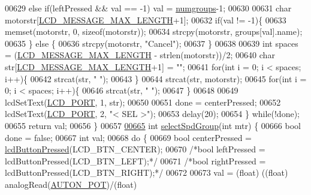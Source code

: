 \begin{DoxyCode}
{{{{{{{{{{00629         \textcolor{keywordflow}{else} \textcolor{keywordflow}{if}(leftPressed && val == -1) val = \hyperlink{lcddiag_8c_a205f1cedec1664555276e0a71a1c87d8}{numgroups}-1;
00630 
00631         \textcolor{keywordtype}{char} motorstr[\hyperlink{lcdmsg_8h_abe4c4b70fc6f44ae3680e5b2c68cdd00}{LCD\_MESSAGE\_MAX\_LENGTH}+1];
00632         \textcolor{keywordflow}{if}(val != -1)\{
00633             memset(motorstr, 0, \textcolor{keyword}{sizeof}(motorstr));
00634             strcpy(motorstr, groups[val].name);
00635         \} \textcolor{keywordflow}{else} \{
00636             strcpy(motorstr, \textcolor{stringliteral}{"Cancel"});
00637         \}
00638 
00639         \textcolor{keywordtype}{int} spaces = (\hyperlink{lcdmsg_8h_abe4c4b70fc6f44ae3680e5b2c68cdd00}{LCD\_MESSAGE\_MAX\_LENGTH} - strlen(motorstr))/2;
00640         \textcolor{keywordtype}{char} str[\hyperlink{lcdmsg_8h_abe4c4b70fc6f44ae3680e5b2c68cdd00}{LCD\_MESSAGE\_MAX\_LENGTH}+1] = \textcolor{stringliteral}{""};
00641         \textcolor{keywordflow}{for}(\textcolor{keywordtype}{int} i = 0; i < spaces; i++)\{
00642             strcat(str, \textcolor{stringliteral}{" "});
00643         \}
00644         strcat(str, motorstr);
00645         \textcolor{keywordflow}{for}(\textcolor{keywordtype}{int} i = 0; i < spaces; i++)\{
00646             strcat(str, \textcolor{stringliteral}{" "});
00647         \}
00648 
00649         lcdSetText(\hyperlink{lcdmsg_8h_abcf42bd88b3c36193f301ca25b033875}{LCD\_PORT}, 1, str);
00650 
00651         done = centerPressed;
00652         lcdSetText(\hyperlink{lcdmsg_8h_abcf42bd88b3c36193f301ca25b033875}{LCD\_PORT}, 2, \textcolor{stringliteral}{"<      SEL     >"});
00653         delay(20);
00654     \} \textcolor{keywordflow}{while}(!done);
00655     \textcolor{keywordflow}{return} val;
00656 \}
00657 
\hypertarget{lcddiag_8c_source.tex_l00665}{}\hyperlink{lcddiag_8c_a7a421f9cf3e21c806080bee51c68a5c9}{00665} \textcolor{keywordtype}{int} \hyperlink{lcddiag_8c_a7a421f9cf3e21c806080bee51c68a5c9}{selectSpdGroup}(\textcolor{keywordtype}{int} mtr) \{
00666     \textcolor{keywordtype}{bool} done = \textcolor{keyword}{false};
00667     \textcolor{keywordtype}{int} val;
00668     \textcolor{keywordflow}{do} \{
00669         \textcolor{keywordtype}{bool} centerPressed = \hyperlink{lcddiag_8h_a74e4c744db49f9b7b645095575e152ad}{lcdButtonPressed}(LCD\_BTN\_CENTER);
00670         \textcolor{comment}{/*bool leftPressed = lcdButtonPressed(LCD\_BTN\_LEFT);*/}
00671         \textcolor{comment}{/*bool rightPressed = lcdButtonPressed(LCD\_BTN\_RIGHT);*/}
00672 
00673         val = (float) ((\textcolor{keywordtype}{float}) analogRead(\hyperlink{autonrecorder_8h_a2490cda7a399f481333af2e5589b74a9}{AUTON\_POT})/(float) 
}}}}}}}}}}
\end{DoxyCode}
